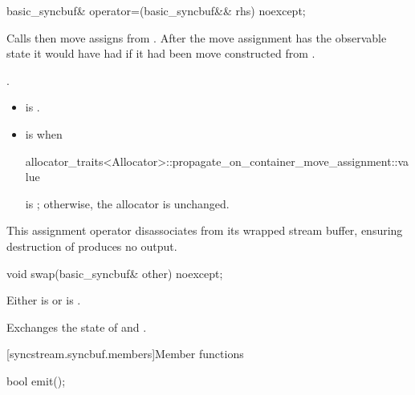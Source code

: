 %
\begin{itemdecl}
basic_syncbuf& operator=(basic_syncbuf&& rhs) noexcept;
\end{itemdecl}

\begin{itemdescr}
\pnum
\effects
Calls  then
move assigns from .
After the move assignment 
has the observable state it would have had if
it had been move constructed from .

\pnum
\returns
{}.

\pnum
\ensures
\begin{itemize}
\item
{} is .
\item
{} is  when
\begin{codeblock}
allocator_traits<Allocator>::propagate_on_container_move_assignment::value
\end{codeblock}
is ; otherwise, the allocator is unchanged.
\end{itemize}

\pnum
\remarks
This assignment operator disassociates 
from its wrapped stream buffer,
ensuring destruction of  produces no output.
\end{itemdescr}

%
\begin{itemdecl}
void swap(basic_syncbuf& other) noexcept;
\end{itemdecl}

\begin{itemdescr}
\pnum
\expects
Either
is 
or
is .

\pnum
\effects
Exchanges the state of  and .
\end{itemdescr}

[syncstream.syncbuf.members]{Member functions}

%
\begin{itemdecl}
bool emit();
\end{itemdecl}

